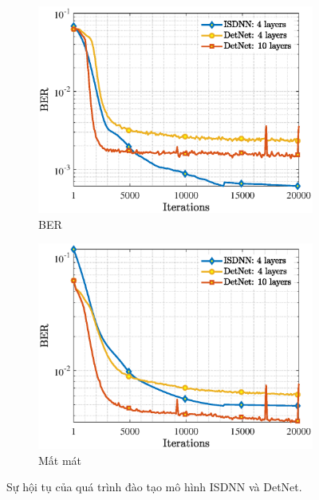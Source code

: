 \begin{figure}[ht]
     \centering
     \begin{subfigure}[b]{0.48\textwidth}
         \centering
         \includegraphics[width=\textwidth]{figures/BER_1.eps}
         \caption{BER}
         \label{fig:ber_1}
     \end{subfigure}
     \hfill
     \begin{subfigure}[b]{0.48\textwidth}
         \centering
         \includegraphics[width=\textwidth]{figures/Loss_1.eps}
         \caption{Mất mát}
         \label{fig:loss_1}
     \end{subfigure}
     \hfill
        \caption{Sự hội tụ của quá trình đào tạo mô hình ISDNN và DetNet.}
        \label{fig:training_1}
\end{figure}

